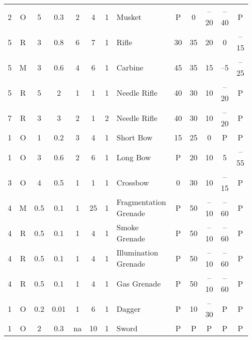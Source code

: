 \begin{table}[htbp]
{\begin{minipage}{0.95\textwidth}
\begin{tabular}{ccccccclccccc}
\rowcolor{grey}
2 & O & 5 & 0.3 & 2 & 4 & 1 & Musket \footnotemark[10] & P & 0 & --20 & --40 & P\\
5 & R & 3 & 0.8 & 6 & 7 & 1 & Rifle\footnotemark[10] & 30 & 35 & 20 & 0 & --15\\
\rowcolor{grey}
5 & M & 3 & 0.6 & 4 & 6 & 1 & Carbine \footnotemark[10] & 45 & 35 & 15 & --5 & --25\\
5 & R & 5 & 2 & 1 & 1 & 1 & Needle Rifle \footnotemark[3]{\tiny $^,$}\footnotemark[10] & 40 & 30 & 10 & --20 & P\\
\rowcolor{grey}
7 & R & 3 & 3 & 2 & 1 & 2 & Needle Rifle \footnotemark[3]{\tiny $^,$}\footnotemark[10] & 40 & 30 & 10 & --20 & P\\
1 & O & 1 & 0.2 & 3 & 4 & 1 & Short Bow \footnotemark[2]{\tiny $^,$}\footnotemark[10] & 15 & 25 & 0 \footnotemark[10] & P & P\\
\rowcolor{grey}
1 & O & 3 & 0.6 & 2 & 6 & 1 & Long Bow \footnotemark[2]{\tiny $^,$}\footnotemark[10] & P & 20 & 10 & 5 \footnotemark[10] & --55 \footnotemark[10]\\
3 & O & 4 & 0.5 & 1 & 1 & 1 & Crossbow & 0 & 30 & 10 & --15 & P\\
\rowcolor{grey}
4 & M & 0.5 & 0.1 & 1 & 25 & 1 & Fragmentation Grenade & P & 50 & --10 & --60 \footnotemark[10] & P\\
4 & R & 0.5 & 0.1 & 1 & 4 & 1 & Smoke Grenade \footnotemark[7] & P & 50 & --10 & --60 \footnotemark[10] & P\\
\rowcolor{grey}
4 & R & 0.5 & 0.1 & 1 & 4 & 1 & Illumination Grenade \footnotemark[8] & P & 50 & --10 & --60 \footnotemark[10] & P\\
4 & R & 0.5 & 0.1 & 1 & 4 & 1 & Gas Grenade \footnotemark[5] & P & 50 & --10 &
      --60 \footnotemark[10] & P\\
\rowcolor{grey}
1 & O & 0.2 & 0.01 & 1 & 6 & 1 & Dagger\footnotemark[6] & P & 10 & --30 \footnotemark[10] & P & P\\
1 & O & 2 & 0.3 & na & 10 & 1 & Sword \footnotemark[6] & P & P & P & P & P\\
  \end{tabular}

  \medskip


\end{minipage}}
\end{table}
